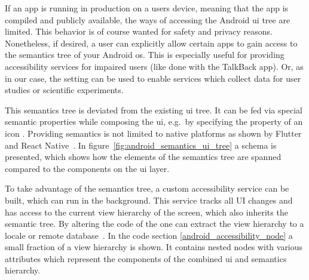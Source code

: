 If an app is running in production on a users device, meaning that the app is compiled and publicly available, the ways of accessing the Android \gls{ui} tree are limited.
This behavior is of course wanted for safety and privacy reasons.
Nonetheless, if desired, a user can explicitly allow certain apps to gain access to the semantics tree of your Android \gls{os}.
This is especially useful for providing accessibility services for impaired users (like done with the TalkBack app).
Or, as in our case, the setting can be used to enable services which collect data for user studies or scientific experiments.

This semantics tree is deviated from the existing \gls{ui} tree.
It can be fed via special semantic properties while composing the \gls{ui}, e.g.\ by specifying the  property of an icon \cite{android_semantics_compose}.
Providing semantics is not limited to native platforms as shown by Flutter~\cite{flutter_semantics} and React Native~\cite{react_native_accessibility}.
In figure~\ref{fig:android_semantics_ui_tree} a schema is presented, which shows how the elements of the semantics tree are spanned compared to the components on the \gls{ui} layer.

To take advantage of the semantics tree, a custom accessibility service can be built, which can run in the background.
This service tracks all UI changes and has access to the current view hierarchy of the screen, which also inherits the semantic tree.
By altering the code of the  one can extract the view hierarchy to a locale or remote database~\cite{android_accessibility_node_info_dumper}.
In the code section \ref{android_accessibility_node} a small fraction of a view hierarchy is shown.
It contains nested nodes with various attributes which represent the components of the combined \gls{ui} and semantics hierarchy.


